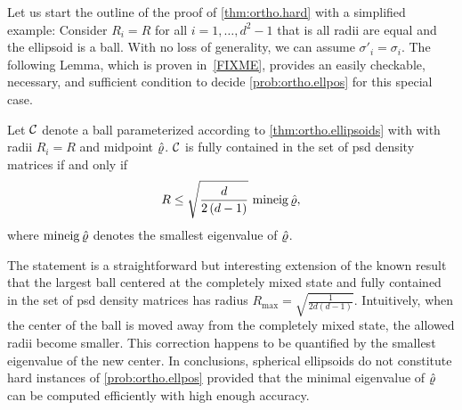 Let us start the outline of the proof of \cref{thm:ortho.hard} with a simplified example:
Consider $R_{i}=R$ for all $i=1,\ldots,d^{2}-1$ that is all radii are equal and the ellipsoid is a ball.
With no loss of generality, we can assume $\sigma'_i = \sigma_i$.
The following Lemma, which is proven in~\cref{FIXME}, provides an easily checkable, necessary, and sufficient condition to decide \cref{prob:ortho.ellpos} for this special case.
\begin{lemma}\label{lem:ortho.spheres}
  Let $\mathcal{C}$ denote a ball parameterized according to \cref{thm:ortho.ellipsoids} with with radii $R_i=R$ and midpoint $\hat{\varrho}$.
  $\mathcal{C}$ is fully contained in the set of psd density matrices if and only if
  \[
    R\leq\sqrt{\frac{d}{2\left(d-1\right)}} \, \operatorname{mineig} \hat{\varrho},
  \]
  where $\operatorname{mineig}\hat{\varrho}$ denotes the smallest eigenvalue of $\hat{\varrho}$.
\end{lemma}
The statement is a straightforward but interesting extension of the known result that the largest ball centered at the completely mixed state and fully contained in the set of psd density matrices has radius $R_{\mathrm{max}}=\sqrt{\frac{1}{2d\left(d-1\right)}}$.
Intuitively, when the center of the ball is moved away from the completely mixed state, the allowed radii become smaller.
This correction happens to be quantified by the smallest eigenvalue of the new center.
In conclusions, spherical ellipsoids do not constitute hard instances of \cref{prob:ortho.ellpos} provided that the minimal eigenvalue of $\hat{\varrho}$ can be computed efficiently with high enough accuracy.

